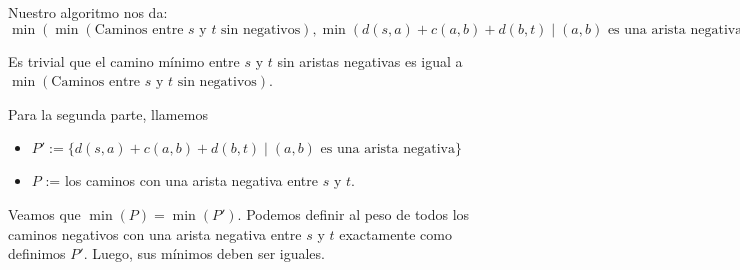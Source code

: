 \documentclass{article}
\begin{document}
Nuestro algoritmo nos da:
\[ \min \left( \min(\text{Caminos entre } s \text{ y } t \text{ sin negativos}), \min(d(s, a) + c(a, b) + d(b, t) \mid (a, b) \text{ es una arista negativa}) \right) \]

Es trivial que el camino mínimo entre \( s \) y \( t \) sin aristas negativas es igual a \( \min(\text{Caminos entre } s \text{ y } t \text{ sin negativos}) \).

Para la segunda parte, llamemos 
\begin{itemize}
    \item \( P' := \{d(s, a) + c(a, b) + d(b, t) \mid (a, b) \text{ es una arista negativa}\} \)
    
    \item \( P \) := los caminos con una arista negativa entre \( s \) y \( t \).
\end{itemize}

Veamos que \( \min(P) = \min(P') \). Podemos definir al peso de todos los caminos negativos con una arista negativa entre \( s \) y \( t \) exactamente como definimos \( P' \). Luego, sus mínimos deben ser iguales.
\end{document}
